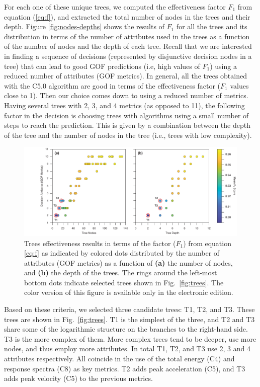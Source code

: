 For each one of these unique trees, we computed the effectiveness factor $F_1$ from equation (\ref{eq:f}), and extracted the total number of nodes in the trees and their depth. Figure \ref{fig:nodes-depths} shows the results of $F_1$ for all the trees and its distribution in terms of the number of attributes used in the trees as a function of the number of nodes and the depth of each tree. Recall that we are interested in finding a sequence of decisions (represented by disjunctive decision nodes in a tree) that can lead to good GOF predictions (i.e, high values of $F_1$) using a reduced number of attributes (GOF metrics). In general, all the trees obtained with the C5.0 algorithm are good in terms of the effectiveness factor ($F_1$ values close to 1). Then our choice comes down to using a reduced number of metrics. Having several trees with 2, 3, and 4 metrics (as opposed to 11), the following factor in the decision is choosing trees with algorithms using a small number of steps to reach the prediction. This is given by a combination between the depth of the tree and the number of nodes in the tree (i.e., trees with low complexity).

\begin{figure}[t]
	\centering
	\includegraphics[width=\textwidth]{figures/pdf/figure-08}
	\caption{Trees effectiveness results in terms of the factor ($F_1$) from equation \ref{eq:f} as indicated by colored dots distributed by the number of attributes (GOF metrics) as a function of \textbf{(a)} the number of nodes, and \textbf{(b)} the depth of the trees. The rings around the left-most bottom dots indicate selected trees shown in Fig.~\ref{fig:trees}. The color version of this figure is available only in the electronic edition.}
	\label{fig:nodes-depth}
\end{figure}

Based on these criteria, we selected three candidate trees: T1, T2, and T3. These trees are shown in Fig.~\ref{fig:trees}. T1 is the simplest of the three, and T2 and T3 share some of the logarithmic structure on the branches to the right-hand side. T3 is the more complex of them. More complex trees tend to be deeper, use more nodes, and thus employ more attributes. In total T1, T2, and T3 use 2, 3 and 4 attributes respectively. All coincide in the use of the total energy (C4) and response spectra (C8) as key metrics. T2 adds peak acceleration (C5), and T3 adds peak velocity (C5) to the previous metrics.

